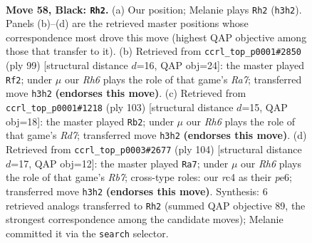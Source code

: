 \documentclass[11pt]{article}
\begin{document}
\clearpage

\begin{figure}[p]\centering
\begin{subfigure}{0.46\textwidth}\centering
\resizebox{\linewidth}{!}{%
\newchessgame
\chessboard[
  setfen={8/5p2/4pk2/1R6/P1R1PK2/5P1r/8/8 b - - 8 58},
  showmover=false,
  pgfstyle=straightmove, color=movearrow, markmove={h3-h2}
]}
\caption{}
\end{subfigure}\hfill
\begin{subfigure}{0.46\textwidth}\centering
\resizebox{\linewidth}{!}{%
\newchessgame
\chessboard[
  setfen={8/8/5p2/6kp/P2R4/6PK/r6P/8 b - - 2 50},
  showmover=false,
  pgfstyle=straightmove, color=movearrow, markmove={a2-f2}
]}
\caption{}
\end{subfigure}
\\[4pt]
\begin{subfigure}{0.46\textwidth}\centering
\resizebox{\linewidth}{!}{%
\newchessgame
\chessboard[
  setfen={8/8/5pk1/5p2/R6P/5PK1/3r2P1/8 b - - 6 52},
  showmover=false,
  pgfstyle=straightmove, color=movearrow, markmove={d2-b2}
]}
\caption{}
\end{subfigure}\hfill
\begin{subfigure}{0.46\textwidth}\centering
\resizebox{\linewidth}{!}{%
\newchessgame
\chessboard[
  setfen={8/1R4p1/4pk2/4r2p/7P/6K1/5PP1/8 w - - 16 53},
  showmover=false,
  pgfstyle=straightmove, color=movearrow, markmove={b7-a7}
]}
\caption{}
\end{subfigure}
\caption{\textbf{Move 58, Black: \texttt{Rh2}.} (a) Our position; Melanie plays \texttt{Rh2} (\texttt{h3h2}). Panels (b)--(d) are the retrieved master positions whose correspondence most drove this move (highest QAP objective among those that transfer to it). (b) Retrieved from \texttt{ccrl\_top\_p0001\#2850} (ply 99) [structural distance $d$=16, QAP obj=24]: the master played \texttt{Rf2}; under $\mu$ our \emph{Rh6} plays the role of that game's \emph{Ra7}; transferred move \texttt{h3h2} \textbf{(endorses this move)}. (c) Retrieved from \texttt{ccrl\_top\_p0001\#1218} (ply 103) [structural distance $d$=15, QAP obj=18]: the master played \texttt{Rb2}; under $\mu$ our \emph{Rh6} plays the role of that game's \emph{Rd7}; transferred move \texttt{h3h2} \textbf{(endorses this move)}. (d) Retrieved from \texttt{ccrl\_top\_p0003\#2677} (ply 104) [structural distance $d$=17, QAP obj=12]: the master played \texttt{Ra7}; under $\mu$ our \emph{Rh6} plays the role of that game's \emph{Rb7}; cross-type roles: our \emph{r}c4 as their \emph{p}e6; transferred move \texttt{h3h2} \textbf{(endorses this move)}. Synthesis: 6 retrieved analogs transferred to \texttt{Rh2} (summed QAP objective 89, the strongest correspondence among the candidate moves); Melanie committed it via the \texttt{search} selector.}
\label{fig:thought-m115}
\end{figure}
\end{document}
